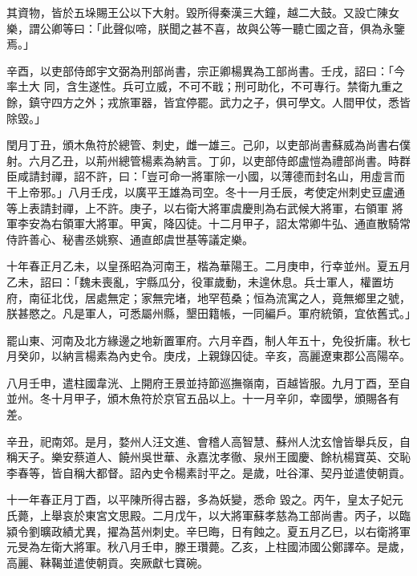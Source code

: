 \begin{pinyinscope}
 其資物，皆於五垛賜王公以下大射。毀所得秦漢三大鐘，越二大鼓。又設亡陳女樂，謂公卿等曰：「此聲似啼，朕聞之甚不喜，故與公等一聽亡國之音，俱為永鑒焉。」



 辛酉，以吏部侍郎宇文弼為刑部尚書，宗正卿楊異為工部尚書。壬戌，詔曰：「今率土大
 同，含生遂性。兵可立威，不可不戢；刑可助化，不可專行。禁衛九重之餘，鎮守四方之外；戎旅軍器，皆宜停罷。武力之子，俱可學文。人間甲仗，悉皆除毀。」



 閏月丁丑，頒木魚符於總管、刺史，雌一雄三。己卯，以吏部尚書蘇威為尚書右僕射。六月乙丑，以荊州總管楊素為納言。丁卯，以吏部侍郎盧愷為禮部尚書。時群臣咸請封禪，詔不許，曰：「豈可命一將軍除一小國，以薄德而封名山，用虛言而干上帝邪。」八月壬戌，以廣平王雄為司空。冬十一月壬辰，考使定州刺史豆盧通等上表請封禪，上不許。庚子，以右衛大將軍虞慶則為右武候大將軍，右領軍
 將軍李安為右領軍大將軍。甲寅，降囚徒。十二月甲子，詔太常卿牛弘、通直散騎常侍許善心、秘書丞姚察、通直郎虞世基等議定樂。



 十年春正月乙未，以皇孫昭為河南王，楷為華陽王。二月庚申，行幸並州。夏五月乙未，詔曰：「魏未喪亂，宇縣瓜分，役軍歲動，未遑休息。兵士軍人，權置坊府，南征北伐，居處無定；家無完堵，地罕苞桑；恒為流寓之人，竟無鄉里之號，朕甚愍之。凡是軍人，可悉屬州縣，墾田籍帳，一同編戶。軍府統領，宜依舊式。」



 罷山東、河南及北方緣邊之地新置軍府。六月辛酉，制人年五十，免役折庸。秋七
 月癸卯，以納言楊素為內史令。庚戌，上親錄囚徒。辛亥，高麗遼東郡公高陽卒。



 八月壬申，遣柱國韋洸、上開府王景並持節巡撫嶺南，百越皆服。九月丁酉，至自並州。冬十月甲子，頒木魚符於京官五品以上。十一月辛卯，幸國學，頒賜各有差。



 辛丑，祀南郊。是月，婺州人汪文進、會稽人高智慧、蘇州人沈玄懀皆舉兵反，自稱天子。樂安蔡道人、饒州吳世華、永嘉沈孝徹、泉州王國慶、餘杭楊寶英、交恥李春等，皆自稱大都督。詔內史令楊素討平之。是歲，吐谷渾、契丹並遣使朝貢。



 十一年春正月丁酉，以平陳所得古器，多為妖變，悉命
 毀之。丙午，皇太子妃元氏薨，上舉哀於東宮文思殿。二月戊午，以大將軍蘇孝慈為工部尚書。丙子，以臨潁令劉曠政績尤異，擢為莒州刺史。辛巳晦，日有蝕之。夏五月乙巳，以右衛將軍元旻為左衛大將軍。秋八月壬申，滕王瓚薨。乙亥，上柱國沛國公鄭譯卒。是歲，高麗、靺鞨並遣使朝貢。突厥獻七寶碗。




\end{pinyinscope}
